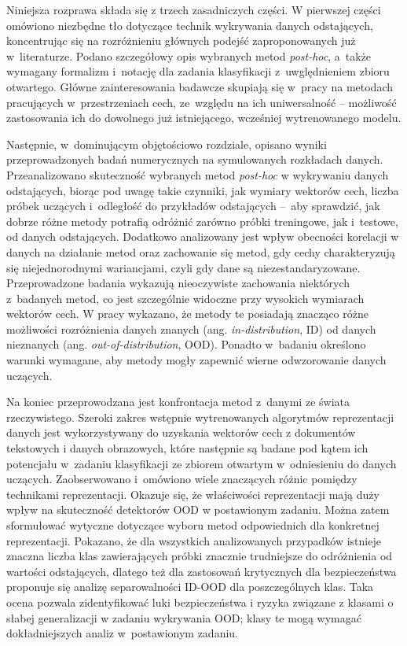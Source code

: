 Niniejsza rozprawa składa się z trzech zasadniczych części. W pierwszej części omówiono niezbędne tło dotyczące technik wykrywania danych odstających, koncentrując się na rozróżnieniu głównych podejść zaproponowanych już w~literaturze. Podano szczegółowy opis wybranych metod \textit{post-hoc}, a~także wymagany formalizm i~notację dla zadania klasyfikacji z~uwględnieniem zbioru otwartego. Główne zainteresowania badawcze skupiają się w~pracy na metodach pracujących w~przestrzeniach cech, ze~względu na ich uniwersalność – możliwość zastosowania ich do dowolnego już istniejącego, wcześniej wytrenowanego modelu.

Następnie, w~dominującym objętościowo rozdziale, opisano wyniki przeprowadzonych badań numerycznych na symulowanych rozkładach danych. Przeanalizowano skuteczność wybranych metod \textit{post-hoc} w wykrywaniu danych odstających, biorąc pod uwagę takie czynniki, jak wymiary wektorów cech, liczba próbek uczących i~odległość do przykładów odstających –~aby sprawdzić, jak dobrze różne metody potrafią odróżnić zarówno próbki treningowe, jak i~testowe, od danych odstających. Dodatkowo analizowany jest wpływ obecności korelacji w danych na działanie metod oraz zachowanie się metod, gdy cechy charakteryzują się niejednorodnymi wariancjami, czyli gdy dane są niezestandaryzowane. Przeprowadzone badania wykazują nieoczywiste zachowania niektórych z~badanych metod, co jest szczególnie widoczne przy wysokich wymiarach wektorów cech. W pracy wykazano, że metody te posiadają znacząco różne możliwości rozróżnienia danych znanych (ang. \textit{in-distribution}, ID) od danych nieznanych (ang. \textit{out-of-distribution}, OOD). Ponadto w~badaniu określono warunki wymagane, aby metody mogły zapewnić wierne odwzorowanie danych uczących.

Na koniec przeprowodzana jest konfrontacja metod z~danymi ze świata rzeczywistego. Szeroki zakres wstępnie wytrenowanych algorytmów reprezentacji danych jest wykorzystywany do uzyskania wektorów cech z dokumentów tekstowych i danych obrazowych, które następnie są badane pod kątem ich potencjału w~zadaniu klasyfikacji ze zbiorem otwartym w~odniesieniu do danych uczących. Zaobserwowano i~omówiono wiele znaczących różnic pomiędzy technikami reprezentacji. Okazuje się, że właściwości reprezentacji mają duży wpływ na skuteczność detektorów OOD w postawionym zadaniu. Można zatem sformułować wytyczne dotyczące wyboru metod odpowiednich dla konkretnej reprezentacji. Pokazano, że dla wszystkich analizowanych przypadków istnieje znaczna liczba klas zawierających próbki znacznie trudniejsze do odróżnienia od wartości odstających, dlatego też dla zastosowań krytycznych dla bezpieczeństwa proponuje się analizę separowalności ID-OOD dla poszczególnych klas. Taka ocena pozwala zidentyfikować luki bezpieczeństwa i ryzyka związane z klasami o słabej generalizacji w zadaniu wykrywania OOD; klasy te mogą wymagać dokładniejszych analiz w~postawionym zadaniu.

